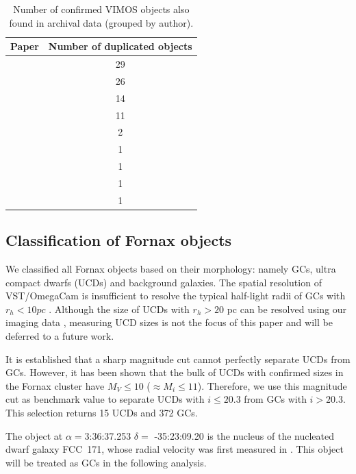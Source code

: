 \documentclass[useAMS,usenatbib]{mn2e}
\newcommand{\kms}{\mbox{\,km~s$^{-1}$}}
\begin{document}
\begin{table}
\centering
\label{mathmode}
\begin{tabular}{@{}l c}
\hline
Paper & Number of duplicated objects \\
\hline
\citet{Dirsch04} &         29 \\
\citet{Schuberth10} &       26 \\
\citet{Bergond07}  &     14 \\
\citet{Firth07}   &      11 \\
\citet{Chilingarian11} &     2 \\
\citet{Mieske04} &       1 \\
\citet{Hilker07}  &     1 \\
\citet{Francis12}   &     1 \\
\citet{Drinkwater00}  &    1 \\
\hline
\end{tabular}
\caption{Number of confirmed VIMOS objects also found in archival data (grouped by author). }
\label{tab:authors} 
\end{table}

\subsection{Classification of Fornax objects}

We classified all Fornax objects based on their morphology: namely GCs, ultra compact dwarfs (UCDs) and background galaxies. The spatial resolution of VST/OmegaCam is insufficient to resolve the typical half-light radii of GCs with $r_h < 10 pc$ \citep{Masters, Puzia11}. Although the size of UCDs with $r_h > 20$ pc can be resolved using our imaging data \citep{Cantiello15}, measuring UCD sizes is not the focus of this paper and will be deferred to a future work.

It is established that a sharp magnitude cut cannot perfectly separate UCDs from GCs. However, it has been shown \citep{Voggel16, Eigenthaler18} that the bulk of UCDs with confirmed sizes in the Fornax cluster have $M_V \le 10$ ($\approx M_i \le 11$). Therefore, we use this magnitude cut as benchmark value to separate UCDs with $i \le 20.3$ from GCs with $i > 20.3$. This selection returns 15 UCDs and 372 GCs. 

The object at $\alpha=$3:36:37.253 $\delta=$ -35:23:09.20 is the nucleus of the nucleated dwarf galaxy FCC~171, whose radial velocity was first measured in \citet{Bergond07}. This object will be treated as GCs in the following analysis.  
\end{document}
